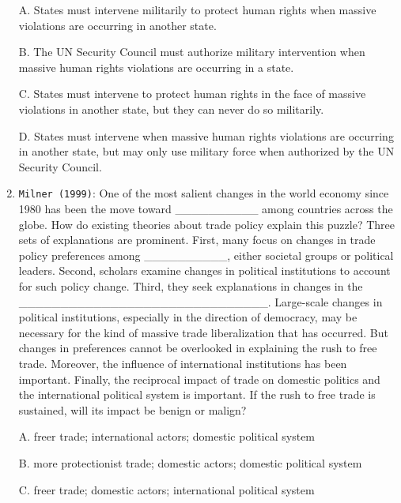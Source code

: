 \documentclass[
]{book}
\begin{document}
\begin{enumerate}
  A. States must intervene militarily to protect human rights when massive violations are occurring in another state.

  B. The UN Security Council must authorize military intervention when massive human rights violations are occurring in a state.

  C. States must intervene to protect human rights in the face of massive violations in another state, but they can never do so militarily.

  D. States must intervene when massive human rights violations are occurring in another state, but may only use military force when authorized by the UN Security Council.
\item
  \texttt{Milner\ (1999)}: One of the most salient changes in the world economy since 1980 has been the move toward \_\_\_\_\_\_\_\_\_\_ among countries across the globe. How do existing theories about trade policy explain this puzzle? Three sets of explanations are prominent. First, many focus on changes in trade policy preferences among \_\_\_\_\_\_\_\_\_\_, either societal groups or political leaders. Second, scholars examine changes in political institutions to account for such policy change. Third, they seek explanations in changes in the \_\_\_\_\_\_\_\_\_\_\_\_\_\_\_\_\_\_\_\_\_\_\_\_\_\_\_\_\_\_. Large-scale changes in political institutions, especially in the direction of democracy, may be necessary for the kind of massive trade liberalization that has occurred. But changes in preferences cannot be overlooked in explaining the rush to free trade. Moreover, the influence of international institutions has been important. Finally, the reciprocal impact of trade on domestic politics and the international political system is important. If the rush to free trade is sustained, will its impact be benign or malign?

  A. freer trade; international actors; domestic political system

  B. more protectionist trade; domestic actors; domestic political system

  C. freer trade; domestic actors; international political system


\end{enumerate}
\end{document}
